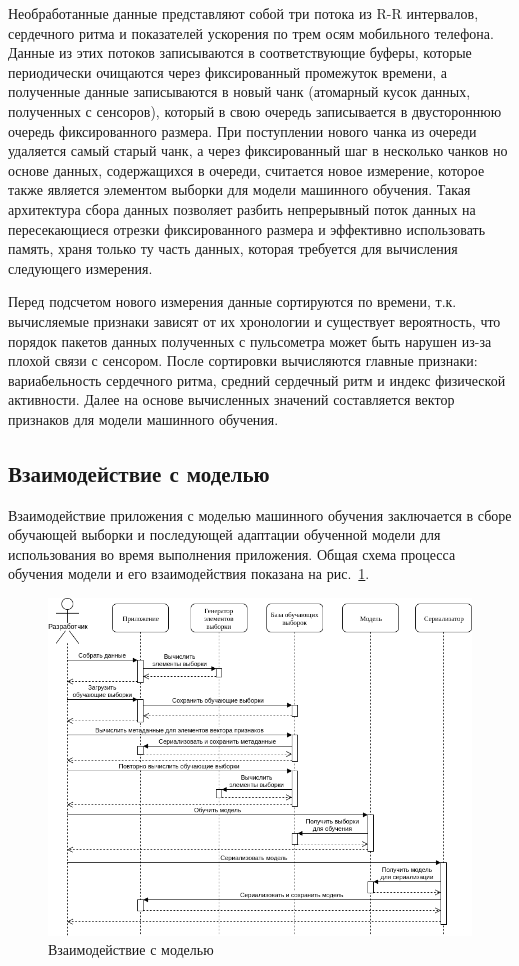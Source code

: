 \documentclass[14pt]{matmex-diploma-custom}
\begin{document}
Необработанные данные представляют собой три потока из R-R интервалов,
сердечного ритма и показателей ускорения по трем осям мобильного телефона.
Данные из этих потоков записываются в соответствующие буферы, которые
периодически очищаются через фиксированный промежуток времени, а полученные
данные записываются в новый чанк (атомарный кусок данных, полученных с
сенсоров), который в свою очередь записывается в двустороннюю очередь
фиксированного размера. При поступлении нового чанка из очереди удаляется самый
старый чанк, а через фиксированный шаг в несколько чанков но основе данных,
содержащихся в очереди, считается новое измерение, которое также является
элементом выборки для модели машинного обучения. Такая архитектура сбора данных
позволяет разбить непрерывный поток данных на пересекающиеся отрезки
фиксированного размера и эффективно использовать память, храня только ту часть
данных, которая требуется для вычисления следующего измерения.

Перед подсчетом нового измерения данные сортируются по времени, т.к. вычисляемые
признаки зависят от их хронологии и существует вероятность, что порядок пакетов
данных полученных с пульсометра может быть нарушен из-за плохой связи с
сенсором. После сортировки вычисляются главные признаки: вариабельность
сердечного ритма, средний сердечный ритм и индекс физической активности. Далее
на основе вычисленных значений составляется вектор признаков для модели
машинного обучения.

\subsection{Взаимодействие с моделью}
Взаимодействие приложения с моделью машинного обучения заключается в сборе
обучающей выборки и последующей адаптации обученной модели для использования во
время выполнения приложения. Общая схема процесса обучения модели и его
взаимодействия показана на рис.~\ref{fig:model_interaction}.

\begin{figure}[ht]
  \centering \includegraphics[width=\textwidth]{images/model_interaction.png}
  \caption{Взаимодействие с моделью}
  \label{fig:model_interaction}
\end{figure}
\end{document}

